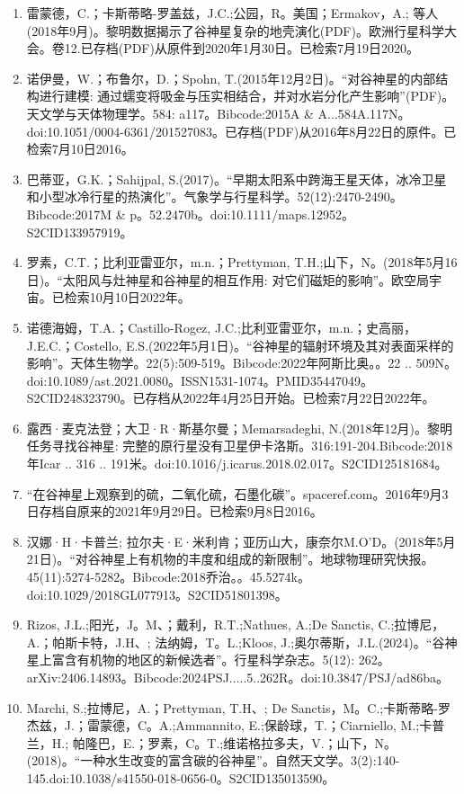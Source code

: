 \begin{enumerate}
\item 雷蒙德，C.；卡斯蒂略-罗盖兹，J.C.;公园，R。美国；Ermakov，A.; 等人 (2018年9月)。黎明数据揭示了谷神星复杂的地壳演化(PDF)。欧洲行星科学大会。卷12.已存档(PDF)从原件到2020年1月30日。已检索7月19日2020。
\item 诺伊曼，W.；布鲁尔，D.；Spohn, T.(2015年12月2日)。“对谷神星的内部结构进行建模: 通过蠕变将吸金与压实相结合，并对水岩分化产生影响”(PDF)。天文学与天体物理学。584: a117。Bibcode:2015A & A...584A.117N。doi:10.1051/0004-6361/201527083。已存档(PDF)从2016年8月22日的原件。已检索7月10日2016。
\item 巴蒂亚，G.K.；Sahijpal, S.(2017)。“早期太阳系中跨海王星天体，冰冷卫星和小型冰冷行星的热演化”。气象学与行星科学。52(12):2470-2490。Bibcode:2017M & p。52.2470b。doi:10.1111/maps.12952。S2CID133957919。 
\item 罗素，C.T.；比利亚雷亚尔，m.n.；Prettyman, T.H.;山下，N。(2018年5月16日)。“太阳风与灶神星和谷神星的相互作用: 对它们磁矩的影响”。欧空局宇宙。已检索10月10日2022年。
\item 诺德海姆，T.A.；Castillo-Rogez, J.C.;比利亚雷亚尔，m.n.；史高丽，J.E.C.；Costello, E.S.(2022年5月1日)。“谷神星的辐射环境及其对表面采样的影响”。天体生物学。22(5):509-519。Bibcode:2022年阿斯比奥。。22 .. 509N。doi:10.1089/ast.2021.0080。ISSN1531-1074。PMID35447049。S2CID248323790。已存档从2022年4月25日开始。已检索7月22日2022年。   
\item 露西·麦克法登；大卫·R·斯基尔曼；Memarsadeghi, N.(2018年12月)。黎明任务寻找谷神星: 完整的原行星没有卫星伊卡洛斯。316:191-204.Bibcode:2018年Icar .. 316 .. 191米。doi:10.1016/j.icarus.2018.02.017。S2CID125181684。 
\item “在谷神星上观察到的硫，二氧化硫，石墨化碳”。spaceref.com。2016年9月3日存档自原来的2021年9月29日。已检索9月8日2016。
\item 汉娜·H·卡普兰; 拉尔夫·E·米利肯；亚历山大，康奈尔M.O'D。(2018年5月21日)。“对谷神星上有机物的丰度和组成的新限制”。地球物理研究快报。45(11):5274-5282。Bibcode:2018乔治。。45.5274k。doi:10.1029/2018GL077913。S2CID51801398。 
\item Rizos, J.L.;阳光，J。M、；戴利，R.T.;Nathues, A.;De Sanctis, C.;拉博尼，A.；帕斯卡特，J.H、; 法纳姆，T。L.;Kloos, J.;奥尔蒂斯，J.L.(2024)。“谷神星上富含有机物的地区的新候选者”。行星科学杂志。5(12): 262。arXiv:2406.14893。Bibcode:2024PSJ.....5..262R。doi:10.3847/PSJ/ad86ba。
\item Marchi, S.;拉博尼，A.；Prettyman, T.H、; De Sanctis，M。C.;卡斯蒂略-罗杰兹，J.；雷蒙德，C。A.;Ammannito, E.;保龄球，T.；Ciarniello, M.;卡普兰，H.; 帕隆巴，E.；罗素，C。T.;维诺格拉多夫，V.；山下，N。(2018)。“一种水生改变的富含碳的谷神星”。自然天文学。3(2):140-145.doi:10.1038/s41550-018-0656-0。S2CID135013590。 

\end{enumerate}
